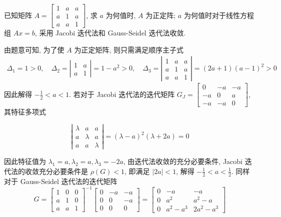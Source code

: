   \begin{tcolorbox}[enhanced,colback=10,colframe=9,breakable,coltitle=green!25!black,title=2024]

已知矩阵 $ A=\left[\begin{array}{ccc}1 & a & a \\ a & 1 & a \\ a & a & 1\end{array}\right] $, 求 $ a $ 为何值时, $ A $ 为正定阵; $ a $ 为何值时对于线性方程组 $ A x=b $, 采用 Jacobi 迭代法和 Gauss-Seidel 迭代法收敛.
 \tcblower
 
 由题意可知, 为了使 $ A $ 为正定矩阵, 则只需满足顺序主子式
$$
\begin{array}{l}
\Delta_{1}=1>0, \quad \Delta_{2}=\left|\begin{array}{cc}
1 & a \\
a & 1
\end{array}\right|=1-a^{2}>0 ,\quad
\Delta_{3}=\left|\begin{array}{lll}
1 & a & a \\
a & 1 & a \\
a & a & 1
\end{array}\right|=(2 a+1)(a-1)^{2}>0
\end{array}
$$
因此解得 $ -\frac{1}{2}<a<1 $.
若对于 Jacobi 迭代法的迭代矩阵 $ G_{J}=\left[\begin{array}{ccc}0 & -a & -a \\ -a & 0 & a \\ -a & -a & 0\end{array}\right] $, 其特征多项式

$$
\left|\begin{array}{ccc}
\lambda & a & a \\
a & \lambda & a \\
a & a & \lambda
\end{array}\right|=(\lambda-a)^{2}(\lambda+2 a)=0
$$

因此特征值为 $ \lambda_{1}=a, \lambda_{2}=a, \lambda_{3}=-2 a $, 由迭代法收敛的充分必要条件, Jacobi 迭代法的收敛充分必要条件是 $ \rho(G)<1 $, 即满足 $ |2 a|<1 $, 解得 $ -\frac{1}{2}<a<\frac{1}{2} $.
同样对于 Gauss-Seidel 迭代法的迭代矩阵
$$
G=\left[\begin{array}{lll}
1 & 0 & 0 \\
a & 1 & 0 \\
a & a & 1
\end{array}\right]^{-1}\left[\begin{array}{ccc}
0 & -a & -a \\
0 & 0 & -a \\
0 & 0 & 0
\end{array}\right]=\left[\begin{array}{ccc}
0 & -a & -a \\
0 & a^{2} & a^{2}-a \\
0 & a^{2}-a^{3} & 2 a^{2}-a^{3}
\end{array}\right]
$$


\end{tcolorbox}
